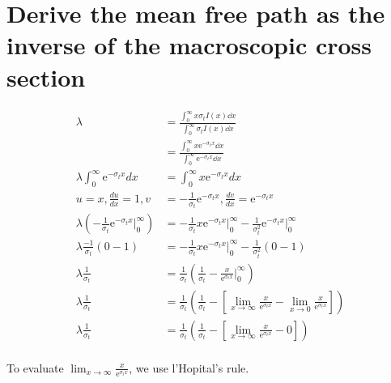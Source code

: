 \documentclass{article}
\begin{document}
\newpage
\section{Derive the mean free path as the inverse of the macroscopic cross section}


\begin{align*}
	\lambda &= \frac{\int_0^\infty x \sigma_t I(x) \dd{x}}{\int_0^\infty \sigma_t I(x) \dd{x}} \\
	&= \frac{\int_0^\infty x \mathrm{e}^{-\sigma_t x} \dd{x}}{\int_0^\infty \mathrm{e}^{-\sigma_t x} \dd{x}} \\
	\lambda \int_0^\infty \mathrm{e}^{-\sigma_t x} dx &= \int_0^\infty x \mathrm{e}^{-\sigma_t x} dx \\
    u = x, \frac{du}{dx} = 1, v &= -\frac{1}{\sigma_t} \mathrm{e}^{-\sigma_t x}, \frac{dv}{dx} = \mathrm{e}^{-\sigma_t x} \\
    \lambda \left(-\frac{1}{\sigma_t} \mathrm{e}^{-\sigma_t x} \Big|_0^\infty\right) &= -\frac{1}{\sigma_t} x \mathrm{e}^{-\sigma_t x}\Big|_0^\infty - \frac{1}{\sigma_t^2}\mathrm{e}^{-\sigma_t x}\Big|_0^\infty \\
    \lambda \frac{-1}{\sigma_t} \left( 0 - 1 \right) &= -\frac{1}{\sigma_t} x \mathrm{e}^{-\sigma_t x}\Big|_0^\infty - \frac{1}{\sigma_t^2} \left( 0 - 1 \right) \\
    \lambda \frac{1}{\sigma_t} &= \frac{1}{\sigma_t} \left( \frac{1}{\sigma_t} - \frac{x}{\mathrm{e}^{\sigma_t x}}\Big|_0^\infty \right) \\
    \lambda \frac{1}{\sigma_t} &= \frac{1}{\sigma_t} \left( \frac{1}{\sigma_t} - \left[ \lim_{x\to\infty}\frac{x}{\mathrm{e}^{\sigma_t x}} - \lim_{x\to0}\frac{x}{\mathrm{e}^{\sigma_t x}} \right] \right) \\
    \lambda \frac{1}{\sigma_t} &= \frac{1}{\sigma_t} \left( \frac{1}{\sigma_t} - \left[ \lim_{x\to\infty}\frac{x}{\mathrm{e}^{\sigma_t x}} - 0 \right] \right) \\
\end{align*}

To evaluate $\lim_{x\to\infty}\frac{x}{\mathrm{e}^{\sigma_t x}}$, we use l'Hopital's rule.
\end{document}
